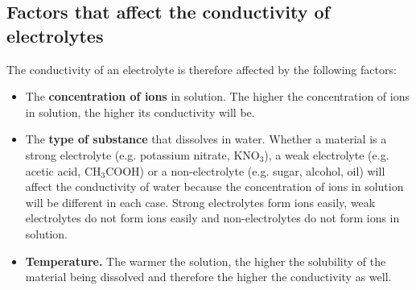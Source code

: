             \subsection*{Factors that affect the conductivity of electrolytes}
            \nopagebreak
            \label{m38720*id339287}The conductivity of an electrolyte is therefore affected by the following factors:\par 
        \label{m38720*id339291}\begin{itemize}[noitemsep]
\label{m38720*uid58}\item The \textbf{concentration of ions} in solution. The higher the concentration of ions in solution, the higher its conductivity will be.
\label{m38720*uid57}\item The \textbf{type of substance} that dissolves in water. Whether a material is a strong electrolyte (e.g. potassium nitrate, ${\text{KNO}}_{3}$), a weak electrolyte (e.g. acetic acid, ${\text{CH}}_{3}\text{COOH}$) or a non-electrolyte (e.g. sugar, alcohol, oil) will affect the conductivity of water because the concentration of ions in solution will be different in each case. Strong electrolytes form ions easily, weak electrolytes do not form ions easily and non-electrolytes do not form ions in solution.
\label{m38720*uid59}\item \textbf{Temperature.}
The warmer the solution, the higher the solubility of the material being dissolved and therefore the higher the conductivity as well.
\end{itemize} \nopagebreak
\label{m38720*secfhsst!!!underscore!!!id739}
